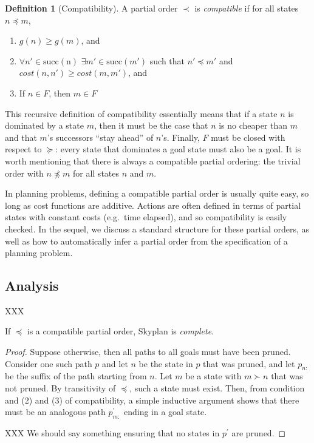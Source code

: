 \documentclass[letterpaper]{article}
\theoremstyle{plain} \newtheorem{theorem}{Theorem} \newtheorem{proposition}{Proposition} \newtheorem{lemma}{Lemma}
\theoremstyle{definition} \newtheorem{definition}{Definition} \newtheorem{conjecture}{Conjecture} \newtheorem*{example}{Example}
\theoremstyle{remark} \newtheorem*{remark}{Remark} \newtheorem*{note}{Note} \newtheorem{case}{Case}
\begin{document}
\begin{definition}[Compatibility]
	\label{def-compatibility}
  A partial order $\prec$ is \textit{compatible} if for all states $n \preceq m$,
  \begin{enumerate}
    \item $g(n) \ge g(m)$, and 
    \item $\forall n' \in \mathrm{succ(n)}$ $\exists m' \in
      \mathrm{succ}(m')$ such that $n' \preceq m'$ and
      $cost(n,n') \ge cost(m, m')$, and
    \item If $n \in F$, then $m \in F$
  \end{enumerate}
\end{definition}
This recursive definition of compatibility essentially means that
if a state $n$ is dominated by a state $m$, then it must be the
case that $n$ is no cheaper than $m$ and that $m$'s successors
``stay ahead'' of $n$'s. Finally, $F$ must be closed with respect
to $\succeq$: every state that dominates a goal state must also be
a goal. It is worth mentioning that there is always a compatible
partial ordering: the trivial order with $n \npreceq m$ for all
states $n$ and $m$.

In planning problems, defining a compatible partial order is usually
quite easy, so long as cost functions are additive.  Actions are
often defined in terms of partial states with constant costs (e.g.\
time elapsed), and so compatibility is easily checked.  In the
sequel, we discuss a standard structure for these partial orders,
as well as how to automatically infer a partial order from the
specification of a planning problem.

\subsection{Analysis}

XXX

\begin{claim}{}\label{clm-complete}
   If $\preceq$ is a compatible partial order, Skyplan
is \emph{complete}.
\end{claim}
\begin{proof} Suppose otherwise, then all paths to all goals must
have been pruned. Consider one such path $p$ and let $n$ be the
state in $p$ that was pruned, and let $p_{n:}$ be the suffix of the
path starting from $n$. Let $m$ be a state with $m \succ n$ that was
not pruned.  By transitivity of $\preceq$, such a state must exist.
Then, from condition and (2) and (3) of compatibility, a simple
inductive argument shows that there must be an analogous path 
$p^\prime_{m:}$ ending in a goal state.

  XXX We should say something ensuring that no states in $p^\prime$ are pruned.
\end{proof}
  
\end{document}
